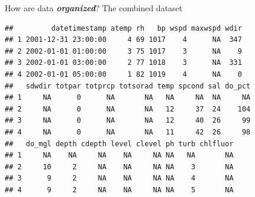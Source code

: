 \documentclass[serif]{beamer}\usepackage[]{graphicx}\usepackage[]{color}
\makeatletter
\newenvironment{kframe}{%
 \def\at@end@of@kframe{}%
 \ifinner\ifhmode%
  \def\at@end@of@kframe{\end{minipage}}%
  \begin{minipage}{\columnwidth}%
 \fi\fi%
 \def\FrameCommand##1{\hskip\@totalleftmargin \hskip-\fboxsep
 \colorbox{shadecolor}{##1}\hskip-\fboxsep
     \hskip-\linewidth \hskip-\@totalleftmargin \hskip\columnwidth}%
 \MakeFramed {\advance\hsize-\width
   \@totalleftmargin\z@ \linewidth\hsize
   \@setminipage}}%
 {\par\unskip\endMakeFramed%
 \at@end@of@kframe}
\newenvironment{knitrout}{}{} %
\newcommand{\Bigtxt}[1]{\textbf{\textit{#1}}}
\makeatother
\begin{document}
\begin{frame}[fragile]{How are data \Bigtxt{organized}?}
The combined dataset
\begin{knitrout}\small
{}\color{fgcolor}\begin{kframe}
\begin{verbatim}
##         datetimestamp atemp rh   bp wspd maxwspd wdir
## 1 2001-12-31 23:00:00     4 69 1017    4      NA  347
## 2 2002-01-01 01:00:00     3 75 1017    3      NA    9
## 3 2002-01-01 03:00:00     2 77 1018    3      NA  331
## 4 2002-01-01 05:00:00     1 82 1019    4      NA    0
##   sdwdir totpar totprcp totsorad temp spcond sal do_pct
## 1     NA      0      NA       NA   NA     NA  NA     NA
## 2     NA      0      NA       NA   12     37  24    104
## 3     NA      0      NA       NA   12     40  26     99
## 4     NA      0      NA       NA   11     42  26     98
##   do_mgl depth cdepth level clevel ph turb chlfluor
## 1     NA    NA     NA    NA     NA NA   NA       NA
## 2     10     2     NA    NA     NA NA    3       NA
## 3      9     2     NA    NA     NA NA    4       NA
## 4      9     2     NA    NA     NA NA    5       NA
\end{verbatim}
\end{kframe}
\end{knitrout}
\end{frame}
\end{document}
